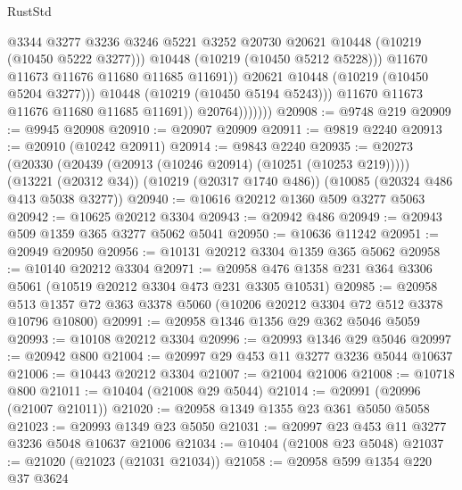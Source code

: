 \begin{lexlean}{RustStd}
\begin{coremodule}
                                  @3344
                                  @3277
                                  @3236
                                  @3246
                                  @5221
                                  @3252
                                  @20730
                                  @20621
                                  @10448
                                  (@10219 (@10450 @5222 @3277)))
                                @10448
                                (@10219 (@10450 @5212 @5228)))
                              @11670
                              @11673
                              @11676
                              @11680
                              @11685
                              @11691))
                          @20621
                          @10448
                          (@10219 (@10450 @5204 @3277)))
                        @10448
                        (@10219 (@10450 @5194 @5243)))
                      @11670
                      @11673
                      @11676
                      @11680
                      @11685
                      @11691))
                  @20764)))))))
@20908 := @9748 @219
@20909 := @9945 @20908
@20910 := @20907 @20909
@20911 := @9819 @2240
@20913 := @20910 (@10242 @20911)
@20914 := @9843 @2240
@20935 := @20273
    (@20330 (@20439 (@20913 (@10246 @20914) (@10251 (@10253 @219)))))
    (@13221 (@20312 @34))
    (@10219 (@20317 @1740 @486))
    (@10085 (@20324 @486 @413 @5038 @3277))
@20940 := @10616 @20212 @1360 @509 @3277 @5063
@20942 := @10625 @20212 @3304
@20943 := @20942 @486
@20949 := @20943 @509 @1359 @365 @3277 @5062 @5041
@20950 := @10636 @11242
@20951 := @20949 @20950
@20956 := @10131 @20212 @3304 @1359 @365 @5062
@20958 := @10140 @20212 @3304
@20971 := @20958 @476 @1358 @231 @364 @3306 @5061 (@10519 @20212 @3304 @473 @231 @3305 @10531)
@20985 := @20958 @513 @1357 @72 @363 @3378 @5060 (@10206 @20212 @3304 @72 @512 @3378 @10796 @10800)
@20991 := @20958 @1346 @1356 @29 @362 @5046 @5059
@20993 := @10108 @20212 @3304
@20996 := @20993 @1346 @29 @5046
@20997 := @20942 @800
@21004 := @20997 @29 @453 @11 @3277 @3236 @5044 @10637
@21006 := @10443 @20212 @3304
@21007 := @21004 @21006
@21008 := @10718 @800
@21011 := @10404 (@21008 @29 @5044)
@21014 := @20991 (@20996 (@21007 @21011))
@21020 := @20958 @1349 @1355 @23 @361 @5050 @5058
@21023 := @20993 @1349 @23 @5050
@21031 := @20997 @23 @453 @11 @3277 @3236 @5048 @10637 @21006
@21034 := @10404 (@21008 @23 @5048)
@21037 := @21020 (@21023 (@21031 @21034))
@21058 := @20958
    @599
    @1354
    @220
    @37
    @3624

\end{coremodule}
\end{lexlean}
